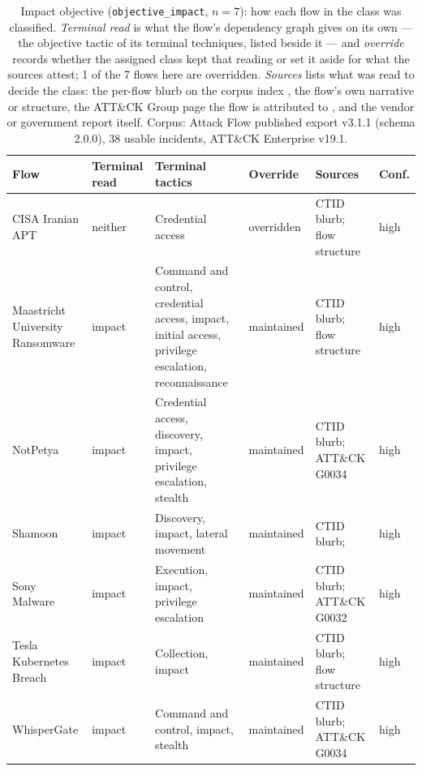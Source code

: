 \begin{table}[htbp]
\centering
\scriptsize
\setlength{\tabcolsep}{4pt}
\caption[Impact objective: per-flow classification]{Impact objective (\texttt{objective\_impact}, $n=7$): how each flow in the class was classified. \emph{Terminal read} is what the flow's dependency graph gives on its own --- the objective tactic of its terminal techniques, listed beside it --- and \emph{override} records whether the assigned class kept that reading or set it aside for what the sources attest; 1 of the 7 flows here are overridden. \emph{Sources} lists what was read to decide the class: the per-flow blurb on the corpus index \citep{ctid2025attackflow}, the flow's own narrative or structure, the ATT\&CK Group page the flow is attributed to \citep{mitre2026attackv19}, and the vendor or government report itself. Corpus: Attack Flow published export v3.1.1 (schema 2.0.0), 38 usable incidents, ATT\&CK Enterprise v19.1.}
\label{tab:objective-audit-impact}
\begin{tabular}{@{}A{0.175\textwidth}A{0.100\textwidth}A{0.245\textwidth}A{0.100\textwidth}A{0.225\textwidth}A{0.045\textwidth}@{}}
\toprule
Flow & Terminal read & Terminal tactics & Override & Sources & Conf. \\
\midrule
CISA Iranian APT & neither & Credential access & overridden & CTID blurb; flow structure & high \\
Maastricht University Ransomware & impact & Command and control, credential access, impact, initial access, privilege escalation, reconnaissance & maintained & CTID blurb; flow structure & high \\
NotPetya & impact & Credential access, discovery, impact, privilege escalation, stealth & maintained & CTID blurb; ATT\&CK G0034 & high \\
Shamoon & impact & Discovery, impact, lateral movement & maintained & CTID blurb; \citep{mcafeeshamoon} & high \\
Sony Malware & impact & Execution, impact, privilege escalation & maintained & CTID blurb; ATT\&CK G0032 & high \\
Tesla Kubernetes Breach & impact & Collection, impact & maintained & CTID blurb; flow structure & high \\
WhisperGate & impact & Command and control, impact, stealth & maintained & CTID blurb; ATT\&CK G0034 & high \\
\bottomrule
\end{tabular}
\end{table}

